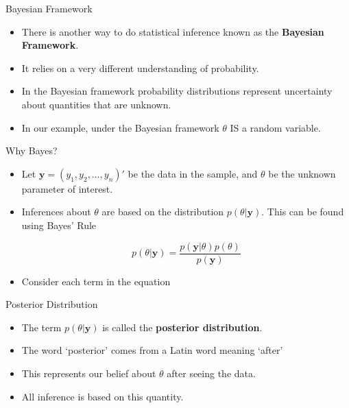 \documentclass[10pt]{beamer}
\begin{document}
\begin{frame}{Bayesian Framework}
  \begin{itemize}
  \item There is another way to do statistical inference known as the {\bf Bayesian Framework}.

  \item It relies on a very different understanding of probability.

  \item In the Bayesian framework probability distributions represent uncertainty about quantities that are unknown.

  \item In our example, under the Bayesian framework $\theta$ IS a random variable.
  \end{itemize}
\end{frame}
\begin{frame}{Why Bayes?}
  \begin{itemize}
  \item Let ${\bm y}=(y_1,y_2,\ldots,y_n)'$ be the data in the sample, and $\theta$ be the unknown parameter of interest.

  \item Inferences about $\theta$ are based on the distribution $p(\theta|{\bm y})$.  This can be found using Bayes' Rule

    \begin{equation}
      p(\theta|{\bm y})=\frac{p({\bm y}|\theta)p(\theta)}{p({\bm y})}
    \end{equation}

  \item Consider each term in the equation
  \end{itemize}
\end{frame}
\begin{frame}{Posterior Distribution}
  \begin{itemize}
  \item The term $p(\theta|{\bm y})$ is called the {\bf posterior distribution}.

  \item The word `posterior' comes from a Latin word meaning `after'

  \item This represents our belief about $\theta$ after seeing the data.

  \item All inference is based on this quantity.
  \end{itemize}
\end{frame}
\end{document}
